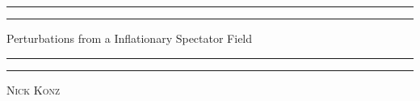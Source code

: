 \documentclass[12pt]{article}
\begin{document}
 
	
	\begin{titlepage} %
		
		\centering %
		
		\scshape %
		
		\vspace*{\baselineskip} %
	
		
		\rule{\textwidth}{1.6pt}\vspace*{-\baselineskip}\vspace*{2pt} %
		\rule{\textwidth}{0.4pt} %
		
		\vspace{0.75\baselineskip} %
		
		{\LARGE Perturbations from a Inflationary Spectator Field } %
		
		\vspace{0.75\baselineskip} %
		
		\rule{\textwidth}{0.4pt}\vspace*{-\baselineskip}\vspace{3.2pt} %
		\rule{\textwidth}{1.6pt} %
		
		\vspace{2\baselineskip} %
		
		
		
		\vspace*{3\baselineskip} %
		
		
		
		\vspace{0.5\baselineskip} %
		
		{\scshape\Large Nick Konz\\} %
		
		\vspace{0.75\baselineskip}
		

\end{titlepage}
\end{document}
